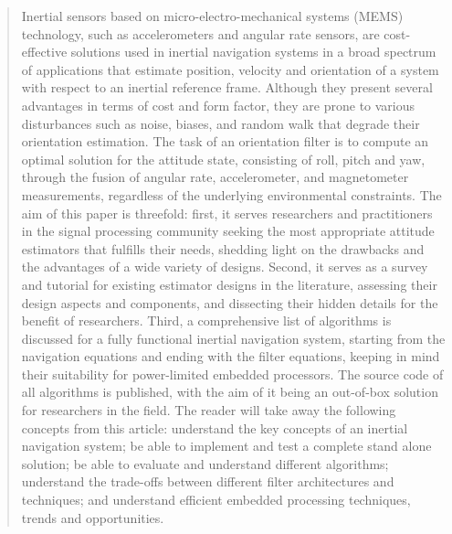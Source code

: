 \documentclass[journal]{IEEEtran}
\begin{document}







\maketitle

\begin{abstract}
Inertial sensors based on micro-electro-mechanical systems (MEMS) technology, such as accelerometers and angular rate sensors, are cost-effective solutions used in inertial navigation systems in a broad spectrum of applications that estimate position, velocity and orientation of a system with respect to an inertial reference frame. Although they present several advantages in terms of cost and form factor, they are prone to various disturbances such as noise, biases, and random walk that degrade their orientation estimation. The task of an orientation filter is to compute an optimal solution for the attitude state, consisting of roll, pitch and yaw, through the fusion of angular rate, accelerometer, and magnetometer measurements, regardless of the underlying environmental constraints. The aim of this paper is threefold: first, it serves researchers and practitioners in the signal processing community seeking the most appropriate attitude estimators that fulfills their needs, shedding light on the drawbacks and the advantages of a wide variety of designs. Second, it serves as a survey and tutorial for existing estimator designs in the literature, assessing their design aspects and components, and dissecting their hidden details for the benefit of researchers. Third, a comprehensive list of algorithms is discussed for a fully functional inertial navigation system, starting from the navigation equations and ending with the filter equations, keeping in mind their suitability for power-limited embedded processors. The source code of all algorithms is published, with the aim of it being an out-of-box solution for researchers in the field. The reader will take away the following concepts from this article: understand the key concepts of an inertial navigation system; be able to implement and test a complete stand alone solution; be able to evaluate and understand different algorithms; understand the trade-offs between different filter architectures and techniques; and understand efficient embedded processing techniques, trends and opportunities. 
\end{abstract}
\end{document}
